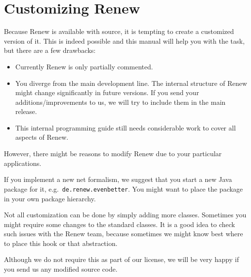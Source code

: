 \section{Customizing Renew}

Because Renew is available with source, it is tempting to
create a customized version of it. This is indeed possible
and this manual will help you with the task,
but there are a few drawbacks:
\begin{itemize}
\item Currently Renew is only partially commented. 
\item You diverge from the main development line. The internal structure
  of Renew might change significantly in future versions. If you send
  your additions/improvements to us,
  we will try to include them in the main release.
\item This internal programming guide still needs considerable
  work to cover all aspects of Renew.
\end{itemize}
However, there might be reasons to modify Renew due to your
particular applications.

If you implement a new net formalism, we suggest that you start a
new Java package for it, e.g.\ \texttt{de.renew.evenbetter}.
You might want to place the package in your own package hierarchy.

Not all customization can be done by simply adding more classes.
Sometimes you might require some changes to the standard classes.
It is a good idea to check such issues with the Renew team,
because sometimes we might know best where to place
this hook or that abstraction.

Although we do not require this as part of our license,
we will be very happy if you send us any modified
source code.

